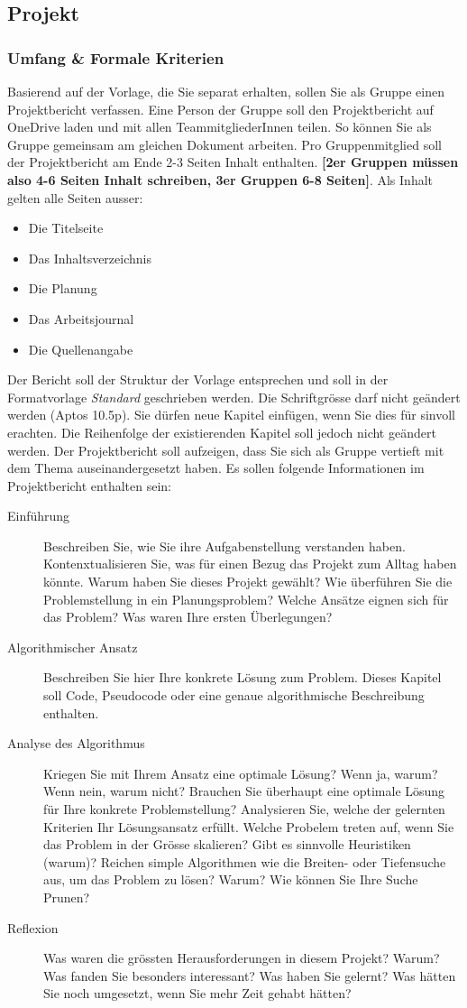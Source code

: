 \documentclass[12pt, a4]{article}
\begin{document}
\subsection*{Projekt}
\subsubsection*{Umfang \& Formale Kriterien}
Basierend auf der Vorlage, die Sie separat erhalten, sollen Sie als Gruppe einen Projektbericht verfassen.
Eine Person der Gruppe soll den Projektbericht auf OneDrive laden und mit allen TeammitgliederInnen teilen.
So können Sie als Gruppe gemeinsam am gleichen Dokument arbeiten.
Pro Gruppenmitglied soll der Projektbericht am Ende 2-3 Seiten Inhalt enthalten.
\textbf{[2er Gruppen müssen also 4-6 Seiten Inhalt schreiben, 3er Gruppen 6-8 Seiten]}.
Als Inhalt gelten alle Seiten ausser:
\begin{itemize}
    \item Die Titelseite
    \item Das Inhaltsverzeichnis
    \item Die Planung
    \item Das Arbeitsjournal
    \item Die Quellenangabe
\end{itemize}
Der Bericht soll der Struktur der Vorlage entsprechen und soll in der Formatvorlage \textit{Standard} geschrieben werden.
Die Schriftgrösse darf nicht geändert werden (Aptos 10.5p). 
Sie dürfen neue Kapitel einfügen, wenn Sie dies für sinvoll erachten.
Die Reihenfolge der existierenden Kapitel soll jedoch nicht geändert werden.
Der Projektbericht soll aufzeigen, dass Sie sich als Gruppe vertieft mit dem Thema auseinandergesetzt haben.
Es sollen folgende Informationen im Projektbericht enthalten sein:
\begin{description}
    \item[Einführung] Beschreiben Sie, wie Sie ihre Aufgabenstellung verstanden haben. Kontenxtualisieren Sie, was für einen Bezug das Projekt zum Alltag haben könnte. Warum haben Sie dieses Projekt gewählt? Wie überführen Sie die Problemstellung in ein Planungsproblem? Welche Ansätze eignen sich für das Problem? Was waren Ihre ersten Überlegungen?
    \item[Algorithmischer Ansatz] Beschreiben Sie hier Ihre konkrete Lösung zum Problem. Dieses Kapitel soll Code, Pseudocode oder eine genaue algorithmische Beschreibung enthalten.
    \item[Analyse des Algorithmus] Kriegen Sie mit Ihrem Ansatz eine optimale Lösung? Wenn ja, warum? Wenn nein, warum nicht? Brauchen Sie überhaupt eine optimale Lösung für Ihre konkrete Problemstellung? Analysieren Sie, welche der gelernten Kriterien Ihr Lösungsansatz erfüllt. Welche Probelem treten auf, wenn Sie das Problem in der Grösse skalieren? Gibt es sinnvolle Heuristiken (warum)? Reichen simple Algorithmen wie die Breiten- oder Tiefensuche aus, um das Problem zu lösen? Warum? Wie können Sie Ihre Suche Prunen?
    \item[Reflexion] Was waren die grössten Herausforderungen in diesem Projekt? Warum? Was fanden Sie besonders interessant? Was haben Sie gelernt? Was hätten Sie noch umgesetzt, wenn Sie mehr Zeit gehabt hätten?
\end{description}
\end{document}
